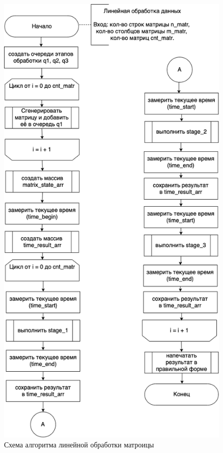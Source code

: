 \documentclass[a4paper,14pt, unknownkeysallowed]{extreport}
\begin{document}
\begin{figure}[h]
	\centering
	\includegraphics[scale=0.55]{img/linear_processing.png}
	\caption{Схема алгоритма линейной обработки матроицы}
	\label{fig:linear_processing}
\end{figure}
\end{document}
